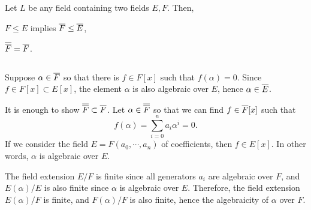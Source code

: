 \documentclass{../exp}
\begin{document}
\begin{lem}
Let $L$ be any field containing two fields $E,F$.
Then,
\begin{cond}
\item $F\le E$ implies $\overline F\le \overline E$,
\item $\overline{\overline F}=\overline F$.
\end{cond}
\end{lem}
\begin{pf}$ $\\[-12pt]
\begin{cond}
\item
Suppose $\alpha\in\overline F$ so that there is $f\in F[x]$ such that $f(\alpha)=0$.
Since $f\in F[x]\subset E[x]$, the element $\alpha$ is also algebraic over $E$, hence $\alpha\in\overline E$.

\item
It is enough to show $\overline{\overline F}\subset\overline F$.
Let $\alpha\in\overline{\overline F}$ so that we can find $f\in\overline F[x]$ such that
\[f(\alpha)=\sum_{i=0}^na_i\alpha^i=0.\]
If we consider the field $E=F(a_0,\cdots,a_n)$ of coefficients, then $f\in E[x]$.
In other words, $\alpha$ is algebraic over $E$.

The field extension $E/F$ is finite since all generators $a_i$ are algebraic over $F$, and $E(\alpha)/E$ is also finite since $\alpha$ is algebraic over $E$.
Therefore, the field extension $E(\alpha)/F$ is finite, and $F(\alpha)/F$ is also finite, hence the algebraicity of $\alpha$ over $F$.
\end{cond}
\end{pf}
\end{document}
